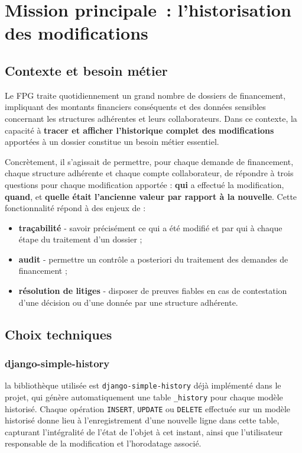 
\chapter{Mission principale~: l'historisation des modifications}
\label{chap:historisation}

\section{Contexte et besoin métier}

Le FPG traite quotidiennement un grand nombre de dossiers de financement,
impliquant des montants financiers conséquents et des données sensibles
concernant les structures adhérentes et leurs collaborateurs. Dans ce
contexte, la capacité à \textbf{tracer et afficher l'historique complet
des modifications} apportées à un dossier constitue un besoin métier
essentiel.

Concrètement, il s'agissait de permettre, pour chaque demande de
financement, chaque structure adhérente et chaque compte collaborateur,
de répondre à trois questions pour chaque modification apportée :
\textbf{qui} a effectué la modification, \textbf{quand}, et
\textbf{quelle était l'ancienne valeur par rapport à la nouvelle}. Cette
fonctionnalité répond à des enjeux de :

\begin{itemize}
  \item \textbf{traçabilité}  -  savoir précisément ce qui a été modifié
        et par qui à chaque étape du traitement d'un dossier ;
  \item \textbf{audit}  -  permettre un contrôle a posteriori du
        traitement des demandes de financement ;
  \item \textbf{résolution de litiges}  -  disposer de preuves fiables en
        cas de contestation d'une décision ou d'une donnée par une
        structure adhérente.
\end{itemize}

\section{Choix techniques}

\subsection{django-simple-history}

la bibliothèque utilisée est \texttt{django-simple-history} déjà implémenté dans le projet,
qui génère automatiquement une table \texttt{\_history} pour chaque
modèle historisé. Chaque opération \texttt{INSERT}, \texttt{UPDATE} ou
\texttt{DELETE} effectuée sur un modèle historisé donne lieu à
l'enregistrement d'une nouvelle ligne dans cette table, capturant
l'intégralité de l'état de l'objet à cet instant, ainsi que l'utilisateur
responsable de la modification et l'horodatage associé.

